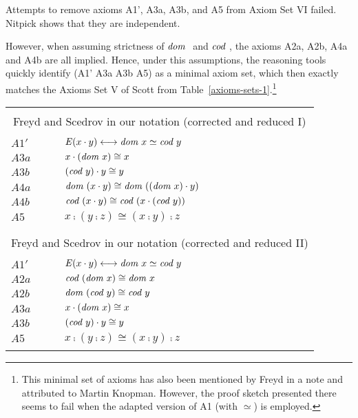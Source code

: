 Attempts to remove axioms A1', A3a, A3b, and A5 from Axiom Set VI failed. Nitpick shows that they are independent. 

However, when assuming strictness of $\textit{dom \/}$ and $\textit{cod \/}$, the axioms
A2a, A2b, A4a and A4b are all implied. Hence, under this 
   assumptions, the reasoning tools quickly identify (A1' A3a A3b A5) as a minimal axiom 
   set, which then exactly matches the Axioms Set V of Scott from Table~\ref{axioms-sets-1}.\footnote{This minimal set of axioms 
   has also been mentioned by Freyd in a note \cite{Freyd16} and attributed to Martin Knopman. However, the proof
   sketch presented there seems to fail when the adapted version of A1 (with $\simeq$) is employed.}


\begin{table} \centering \normalsize
\begin{tabular}{ll}
\\
\hline
\\
\multicolumn{2}{c}{Freyd and Scedrov in our notation (corrected and
  reduced I)} \\
\\
  $A1'$  & $\mathit{E} (x \cdot y) \longleftrightarrow \textit{dom \/} x \simeq\textit{cod \/} y$ \\
  $A3a$  & $x \cdot (\textit{dom \/} x) \cong x$ \\ 
  $A3b$ & $(\textit{cod \/} y) \cdot y \cong y$ \\
  $A4a$ & $\textit{dom \/}(x \cdot y) \cong \textit{dom \/}((\textit{dom \/} x) \cdot y)$ \\ 
  $A4b$ & $\textit{cod \/}(x \cdot y) \cong \textit{cod \/}(x \cdot (\textit{cod \/} y))$ \\ 
  $A5$   & $x \comp (y \comp z) \cong  (x \comp y) \comp z$   \\
\\
\hline
\\
\multicolumn{2}{c}{Freyd and Scedrov in our notation (corrected and
  reduced II)} \\
\\
  $A1'$  & $\mathit{E} (x \cdot y) \longleftrightarrow \textit{dom \/} x \simeq\textit{cod \/} y$ \\
  $A2a$ & $\textit{cod \/}(\textit{dom \/} x) \cong \textit{dom \/} x$ \\  
  $A2b$ & $\textit{dom \/}(\textit{cod \/} y) \cong \textit{cod \/} y$ \\  
  $A3a$  & $x \cdot (\textit{dom \/} x) \cong x$ \\ 
  $A3b$ & $(\textit{cod \/} y) \cdot y \cong y$ \\
  $A5$   & $x \comp (y \comp z) \cong  (x \comp y) \comp z$   \\
\\

\end{tabular}
\end{table}
